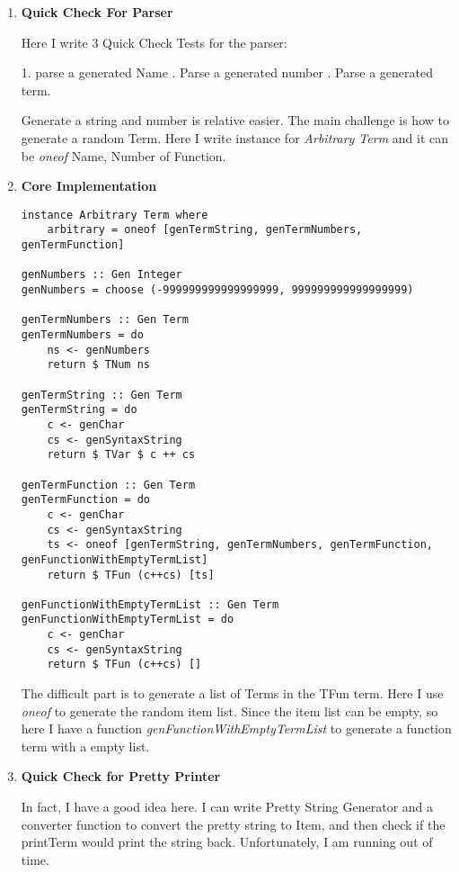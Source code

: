 \documentclass[11pt]{article}
\begin{document}
\begin{enumerate}
\item \textbf{Quick Check For Parser}

Here I write 3 Quick Check Tests for the parser: 

1. parse a generated Name . Parse a generated number . Parse a generated term. 

Generate a string and number is relative easier. The main challenge is how to generate a random Term. Here I write instance for \textit{Arbitrary Term} and it can be \textit{oneof} Name, Number of Function. 

\item \textbf{Core Implementation}

\begin{lstlisting}
instance Arbitrary Term where
    arbitrary = oneof [genTermString, genTermNumbers, genTermFunction]

genNumbers :: Gen Integer
genNumbers = choose (-999999999999999999, 999999999999999999)

genTermNumbers :: Gen Term
genTermNumbers = do
    ns <- genNumbers
    return $ TNum ns

genTermString :: Gen Term
genTermString = do
    c <- genChar
    cs <- genSyntaxString
    return $ TVar $ c ++ cs

genTermFunction :: Gen Term
genTermFunction = do
    c <- genChar
    cs <- genSyntaxString
    ts <- oneof [genTermString, genTermNumbers, genTermFunction, genFunctionWithEmptyTermList]
    return $ TFun (c++cs) [ts]

genFunctionWithEmptyTermList :: Gen Term
genFunctionWithEmptyTermList = do
    c <- genChar
    cs <- genSyntaxString
    return $ TFun (c++cs) []
\end{lstlisting}

The difficult part is to generate a list of Terms in the TFun term. Here I use \textit{oneof} to generate the random item list. Since the item list can be empty, so here I have a function \textit{genFunctionWithEmptyTermList} to generate a function term with a empty list. 
 
\item \textbf{Quick Check for Pretty Printer}

In fact, I have a good idea here. I can write Pretty String Generator and a converter function to convert the pretty string to Item, and then check if the printTerm would print the string back. Unfortunately, I am running out of time. 

\end{enumerate}
\end{document}
